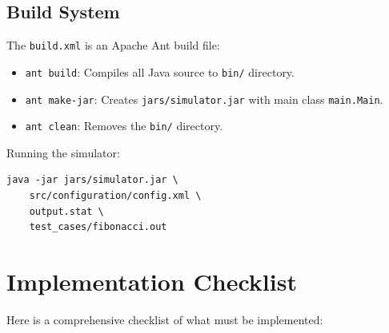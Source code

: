 \documentclass[12pt,a4paper]{article}
\begin{document}
\subsection{Build System}

The \texttt{build.xml} is an Apache Ant build file:

\begin{itemize}
    \item \texttt{ant build}: Compiles all Java source to \texttt{bin/} directory.
    \item \texttt{ant make-jar}: Creates \texttt{jars/simulator.jar} with main class \texttt{main.Main}.
    \item \texttt{ant clean}: Removes the \texttt{bin/} directory.
\end{itemize}

Running the simulator:
\begin{verbatim}
java -jar jars/simulator.jar \
    src/configuration/config.xml \
    output.stat \
    test_cases/fibonacci.out
\end{verbatim}

\section{Implementation Checklist}

Here is a comprehensive checklist of what must be implemented:
\end{document}
